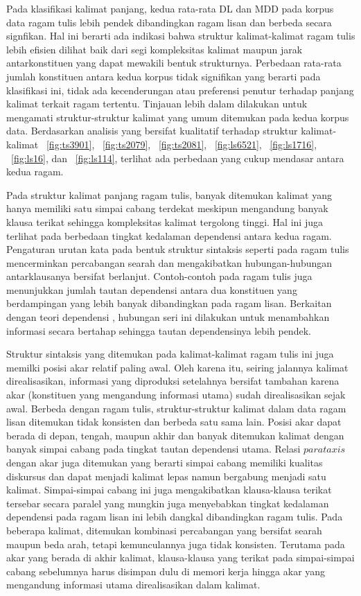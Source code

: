 Pada klasifikasi kalimat panjang, kedua rata-rata DL dan MDD pada korpus data ragam tulis lebih pendek dibandingkan ragam lisan dan berbeda secara signfikan. Hal ini berarti ada indikasi bahwa struktur kalimat-kalimat ragam tulis lebih efisien dilihat baik dari segi kompleksitas kalimat maupun jarak antarkonstituen yang dapat mewakili bentuk strukturnya. Perbedaan rata-rata jumlah konstituen antara kedua korpus tidak signifikan yang berarti pada klasifikasi ini, tidak ada kecenderungan atau preferensi penutur terhadap panjang kalimat terkait ragam tertentu. Tinjauan lebih dalam dilakukan untuk mengamati struktur-struktur kalimat yang umum ditemukan pada kedua korpus data. Berdasarkan analisis yang bersifat kualitatif terhadap struktur kalimat-kalimat \pic~\ref{fig:ts3901}, \pic~\ref{fig:ts2079}, \pic~\ref{fig:ts2081}, \pic~\ref{fig:ls6521}, \pic~\ref{fig:ls1716}, \pic~\ref{fig:ls16}, dan \pic~\ref{fig:ls114}, terlihat ada perbedaan yang cukup mendasar antara kedua ragam. 

Pada struktur kalimat panjang ragam tulis, banyak ditemukan kalimat yang hanya memiliki satu simpai cabang terdekat meskipun mengandung banyak klausa terikat sehingga kompleksitas kalimat tergolong tinggi. Hal ini juga terlihat pada berbedaan tingkat kedalaman dependensi antara kedua ragam. Pengaturan urutan kata pada bentuk struktur sintaksis seperti pada ragam tulis mencerminkan percabangan searah dan mengakibatkan hubungan-hubungan antarklausanya bersifat berlanjut. Contoh-contoh pada ragam tulis juga menunjukkan jumlah tautan dependensi antara dua konstituen yang berdampingan yang lebih banyak dibandingkan pada ragam lisan. Berkaitan dengan teori dependensi \citep{tesniere1959elements, hawkins2014cross, gildea2010grammars}, hubungan seri ini dilakukan untuk menambahkan informasi secara bertahap sehingga tautan dependensinya lebih pendek. 

Struktur sintaksis yang ditemukan pada kalimat-kalimat ragam tulis ini juga memilki posisi akar relatif paling awal. Oleh karena itu, seiring jalannya kalimat direalisasikan, informasi yang diproduksi setelahnya bersifat tambahan karena akar (konstituen yang mengandung informasi utama) sudah direalisasikan sejak awal. Berbeda dengan ragam tulis, struktur-struktur kalimat dalam data ragam lisan ditemukan tidak konsisten dan berbeda satu sama lain. Posisi akar dapat berada di depan, tengah, maupun akhir dan banyak ditemukan kalimat dengan banyak simpai cabang pada tingkat tautan dependensi utama. Relasi $parataxis$ dengan akar juga ditemukan yang berarti simpai cabang memiliki kualitas diskursus dan dapat menjadi kalimat lepas namun bergabung menjadi satu kalimat. Simpai-simpai cabang ini juga mengakibatkan klausa-klausa terikat tersebar secara paralel yang mungkin juga menyebabkan tingkat kedalaman dependensi pada ragam lisan ini lebih dangkal dibandingkan ragam tulis. Pada beberapa kalimat, ditemukan kombinasi percabangan yang bersifat searah maupun beda arah, tetapi kemunculannya juga tidak konsisten. Terutama pada akar yang berada di akhir kalimat, klausa-klausa yang terikat pada simpai-simpai cabang sebelumnya harus disimpan dulu di memori kerja hingga akar yang mengandung informasi utama direalisasikan dalam kalimat. 

